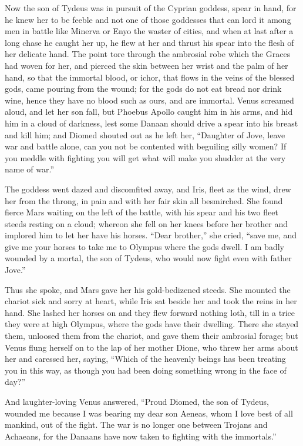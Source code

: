 Now the son of Tydeus was in pursuit of the Cyprian goddess, spear in
hand, for he knew her to be feeble and not one of those goddesses that can
lord it among men in battle like Minerva or Enyo the waster of cities, and
when at last after a long chase he caught her up, he flew at her and
thrust his spear into the flesh of her delicate hand. The point tore
through the ambrosial robe which the Graces had woven for her, and pierced
the skin between her wrist and the palm of her hand, so that the immortal
blood, or ichor, that flows in the veins of the blessed gods, came pouring
from the wound; for the gods do not eat bread nor drink wine, hence they
have no blood such as ours, and are immortal. Venus screamed aloud, and
let her son fall, but Phoebus Apollo caught him in his arms, and hid him
in a cloud of darkness, lest some Danaan should drive a spear into his
breast and kill him; and Diomed shouted out as he left her, “Daughter of
Jove, leave war and battle alone, can you not be contented with beguiling
silly women? If you meddle with fighting you will get what will make you
shudder at the very name of war.”

The goddess went dazed and discomfited away, and Iris, fleet as the wind,
drew her from the throng, in pain and with her fair skin all besmirched.
She found fierce Mars waiting on the left of the battle, with his spear
and his two fleet steeds resting on a cloud; whereon she fell on her knees
before her brother and implored him to let her have his horses. “Dear
brother,” she cried, “save me, and give me your horses to take me to
Olympus where the gods dwell. I am badly wounded by a mortal, the son of
Tydeus, who would now fight even with father Jove.”

Thus she spoke, and Mars gave her his gold-bedizened steeds. She mounted
the chariot sick and sorry at heart, while Iris sat beside her and took
the reins in her hand. She lashed her horses on and they flew forward
nothing loth, till in a trice they were at high Olympus, where the gods
have their dwelling. There she stayed them, unloosed them from the
chariot, and gave them their ambrosial forage; but Venus flung herself on
to the lap of her mother Dione, who threw her arms about her and caressed
her, saying, “Which of the heavenly beings has been treating you in this
way, as though you had been doing something wrong in the face of day?”

And laughter-loving Venus answered, “Proud Diomed, the son of Tydeus,
wounded me because I was bearing my dear son Aeneas, whom I love best of
all mankind, out of the fight. The war is no longer one between Trojans
and Achaeans, for the Danaans have now taken to fighting with the
immortals.”

